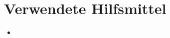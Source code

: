 \chapter{Verwendete Hilfsmittel}
\label{Hilfsmittel}

\begin{itemize}
		\item 
	\end{itemize}
\cleardoublepage